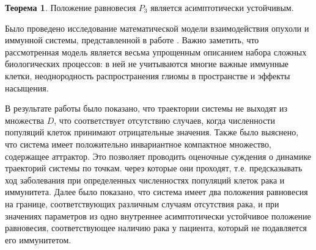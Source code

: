 \documentclass[12pt,a4paper]{extarticle}
\theoremstyle{definition}
\newtheorem{theorem}{Теорема}
\theoremstyle{definition}
\theoremstyle{definition}
\begin{document}
	\begin{theorem}
		Положение равновесия $P_3$ является асимптотически устойчивым. 
	\end{theorem}
	
	\begin{conclusion}
		
	Было проведено исследование математической модели взаимодействия опухоли и иммунной системы, представленной в работе \cite{model}. Важно заметить, что рассмотренная модель является весьма упрощенным описанием набора сложных биологических процессов: в ней не учитываются многие важные иммунные клетки, неоднородность распространения глиомы в пространстве и эффекты насыщения.
	
	В результате работы было показано, что траектории системы не выходят из множества $D$, что соответствует отсутствию случаев, когда численности популяций клеток принимают отрицательные значения. Также было выяснено, что система имеет положительно инвариантное компактное множество, содержащее аттрактор. Это позволяет проводить оценочные суждения о динамике траекторий системы по точкам. через которые они проходят, т.е. предсказывать ход заболевания при определенных численностях популяций клеток рака и иммунитета. Далее было показано, что система имеет два положения равновесия на границе, соответствующих различным случаям отсутствия рака, и при значениях параметров из \cite{model} одно внутреннее асимптотически устойчивое положение равновесия, соответствующее наличию рака у пациента, который не подавляется его иммунитетом. 
	
	\end{conclusion}
	
\end{document}
